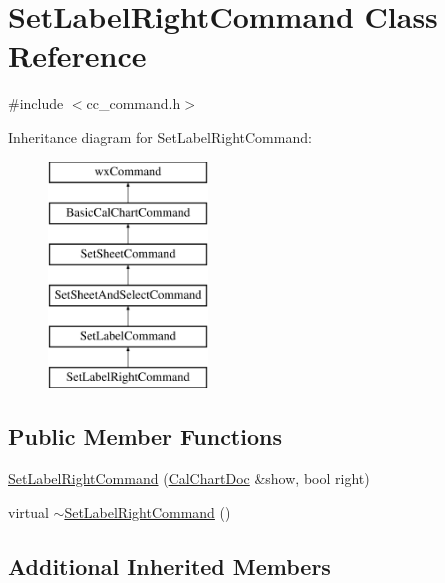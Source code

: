\hypertarget{a00129}{\section{Set\-Label\-Right\-Command Class Reference}
\label{a00129}
}


{\ttfamily \#include $<$cc\-\_\-command.\-h$>$}

Inheritance diagram for Set\-Label\-Right\-Command\-:\begin{figure}[H]
\begin{center}
\leavevmode
\includegraphics[height=6.000000cm]{a00129}
\end{center}
\end{figure}
\subsection*{Public Member Functions}
\begin{DoxyCompactItemize}
\item 
\hyperlink{a00129_a5a7b9ed693d93328dfe8d34a614ad498}{Set\-Label\-Right\-Command} (\hyperlink{a00020}{Cal\-Chart\-Doc} \&show, bool right)
\item 
virtual \hyperlink{a00129_a1cb5ede1c565ff058221c149a5febcfa}{$\sim$\-Set\-Label\-Right\-Command} ()
\end{DoxyCompactItemize}
\subsection*{Additional Inherited Members}


